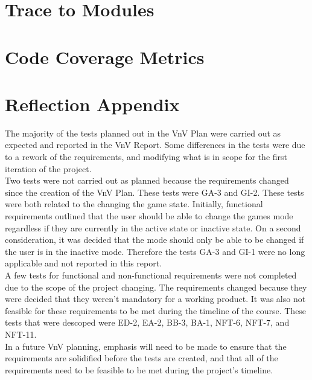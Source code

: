 \documentclass[12pt, titlepage]{article}
\begin{document}
\section{Trace to Modules}		

\section{Code Coverage Metrics}

\appendix
\section{Reflection Appendix}
The majority of the tests planned out in the VnV Plan were carried out as expected and reported in the VnV Report. 
Some differences in the tests were due to a rework of the requirements, and modifying what is in scope for the first iteration of the project.\\

Two tests were not carried out as planned because the requirements changed since the creation of the VnV Plan. These tests were GA-3 and GI-2.
These tests were both related to the changing the game state. Initially, functional requirements outlined that the user should be able to change the games mode
regardless if they are currently in the active state or inactive state. On a second consideration, it was decided that the mode should only be able to be changed if
the user is in the inactive mode. Therefore the tests GA-3 and GI-1 were no long applicable and not reported in this report. \\

A few tests for functional and non-functional requirements were not completed due to the scope of the project changing. The requirements changed because 
they were decided that they weren't mandatory for a working product. It was also not feasible for these requirements to be met during the timeline of the course.
These tests that were descoped were ED-2, EA-2, BB-3, BA-1, NFT-6, NFT-7, and NFT-11.\\

In a future VnV planning, emphasis will need to be made to ensure that the requirements are solidified before the tests are created, and that all of the requirements need to
be feasible to be met during the project's timeline.



\nocite{*}
\end{document}
